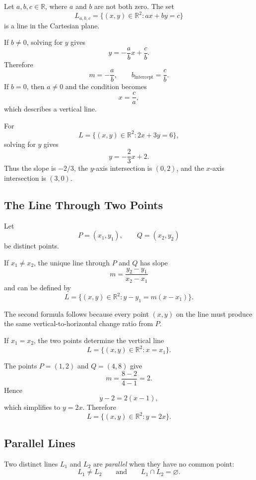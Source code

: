 \begin{definitionbox}
Let $a,b,c\in\mathbb{R}$, where $a$ and $b$ are not both zero. The set
\[
L_{a,b,c}=\{(x,y)\in\mathbb{R}^2:ax+by=c\}
\]
is a line in the Cartesian plane.
\end{definitionbox}

If $b\neq 0$, solving for $y$ gives
\[
y=-\frac{a}{b}x+\frac{c}{b}.
\]
Therefore
\[
\boxed{m=-\frac{a}{b}},
\qquad
\boxed{b_{\mathrm{intercept}}=\frac{c}{b}}.
\]
If $b=0$, then $a\neq 0$ and the condition becomes
\[
x=\frac{c}{a},
\]
which describes a vertical line.

\begin{examplebox}
For
\[
L=\{(x,y)\in\mathbb{R}^2:2x+3y=6\},
\]
solving for $y$ gives
\[
y=-\frac23x+2.
\]
Thus the slope is $-2/3$, the $y$-axis intersection is $(0,2)$, and the
$x$-axis intersection is $(3,0)$.
\end{examplebox}

\subsection{The Line Through Two Points}

Let
\[
P=(x_1,y_1),
\qquad
Q=(x_2,y_2)
\]
be distinct points.

\begin{theorembox}
If $x_1\neq x_2$, the unique line through $P$ and $Q$ has slope
\[
\boxed{m=\frac{y_2-y_1}{x_2-x_1}}
\]
and can be defined by
\[
\boxed{L=\{(x,y)\in\mathbb{R}^2:y-y_1=m(x-x_1)\}}.
\]
\end{theorembox}

The second formula follows because every point $(x,y)$ on the line must produce
the same vertical-to-horizontal change ratio from $P$.

If $x_1=x_2$, the two points determine the vertical line
\[
L=\{(x,y)\in\mathbb{R}^2:x=x_1\}.
\]

\begin{examplebox}
The points $P=(1,2)$ and $Q=(4,8)$ give
\[
m=\frac{8-2}{4-1}=2.
\]
Hence
\[
y-2=2(x-1),
\]
which simplifies to $y=2x$. Therefore
\[
L=\{(x,y)\in\mathbb{R}^2:y=2x\}.
\]
\end{examplebox}

\subsection{Parallel Lines}

\begin{definitionbox}
Two distinct lines $L_1$ and $L_2$ are \emph{parallel} when they have no common
point:
\[
\boxed{L_1\neq L_2
\qquad\text{and}\qquad
L_1\cap L_2=\varnothing.}
\]
\end{definitionbox}

